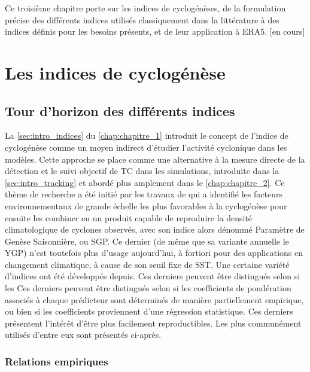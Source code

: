 \documentclass[../main.tex]{subfiles}
\begin{document}
\begin{itshape}
    Ce troisième chapitre porte sur les indices de cyclogénèses, de la formulation précise des différents indices utilisés classiquement dans la littérature à
    des indices définis pour les besoins présents, et de leur application à ERA5. [en cours]
\end{itshape}

\minitoc
\newpage
\section{Les indices de cyclogénèse}\label{sec:intro_chap3}

\subsection{Tour d'horizon des différents indices}\label{sec:tour_horizon_indices}

La \cref{sec:intro_indices} du \cref{chap:chapitre_1} introduit le concept de l'indice de cyclogénèse comme un moyen indirect d'étudier l'activité cyclonique
dans les modèles. Cette approche se place comme une alternative à la mesure directe de la détection et le suivi objectif de TC dans les simulations, introduite
dans la \cref{sec:intro_tracking} et abordé plus amplement dans le \cref{chap:chapitre_2}. Ce thème de recherche a été initié par les travaux de
\textcite{gray_global_1968,gray_tropical_1975} qui a identifié les facteurs environnementaux de grande échelle les plus favorables à la cyclogénèse pour ensuite
les combiner en un produit capable de reproduire la densité climatologique de cyclones observés, avec son indice alors dénommé Paramètre de Genèse Saisonnière,
ou SGP. Ce dernier (de même que sa variante annuelle le YGP) n'est toutefois plus d'usage aujourd'hui, à fortiori pour des applications en changement
climatique, à cause de son seuil fixe de SST. Une certaine variété d'indices ont été développés depuis. Ces derniers peuvent être distingués selon si les Ces
derniers peuvent être distingués selon si les coefficients de pondération associés à chaque prédicteur sont déterminés de manière partiellement empirique, ou
bien si les coefficients proviennent d'une régression statistique. Ces derniers présentent l'intérêt d'être plus facilement reproductibles. Les plus communément
utilisés d'entre eux sont présentés ci-après.

\subsubsection{Relations empiriques}\label{sec:relations_empiriques}
\end{document}
